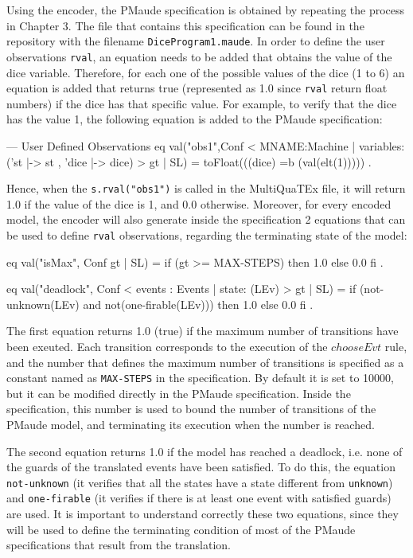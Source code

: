 Using the encoder, the PMaude specification is obtained by repeating the process in Chapter 3. The file that contains this specification can be found in the repository with the filename \texttt{DiceProgram1.maude}. In order to define the user observations \texttt{rval}, an equation needs to be added that obtains the value of the dice variable. Therefore, for each one of the possible values of the dice (1 to 6) an equation is added that returns true (represented as 1.0 since \texttt{rval} return float numbers) if the dice has that specific value. For example, to verify that the dice has the value 1, the following equation is added to the PMaude specification:
\begin{maude}

  --- User Defined Observations 
eq val("obs1",{Conf < MNAME:Machine | 
                    variables:('st |-> st , 'dice |-> dice) >} 
                    {gt | SL}) 
                    = toFloat(((dice) =b (val(elt(1))))) .
\end{maude}
Hence, when the \texttt{s.rval("obs1")} is called in the MultiQuaTEx file, it will return 1.0 if the value of the dice is 1, and 0.0 otherwise. Moreover, for every encoded model, the encoder will also generate inside the specification 2 equations that can be used to define \texttt{rval} observations, regarding the terminating state of the model:
\begin{maude}

eq val("isMax", {Conf} {gt | SL}) = if (gt >= MAX-STEPS) 
                                    then 1.0 
                                    else 0.0 fi .

 eq val("deadlock", {Conf < events : Events | state: (LEv) >} 
                    {gt | SL}) = if (not-unknown(LEv) and not(one-firable(LEv))) 
                                 then 1.0 
                                 else 0.0 fi .
\end{maude}
The first equation returns 1.0 (true) if the maximum number of transitions have been exeuted. Each transition corresponds to the execution of the $chooseEvt$ rule, and the number that defines the maximum number of transitions is specified as a constant named as \texttt{MAX-STEPS} in the specification. By default it is set to 10000, but it can be modified directly in the PMaude specification. Inside the specification, this number is used to bound the number of transitions of the PMaude model, and terminating its execution when the number is reached.

The second equation returns 1.0 if the model has reached a deadlock, i.e. none of the guards of the translated events have been satisfied. To do this, the equation \texttt{not-unknown} (it verifies that all the states have a state different from \texttt{unknown}) and \texttt{one-firable} (it verifies if there is at least one event with satisfied guards) are used. It is important to understand correctly these two equations, since they will be used to define the terminating condition of most of the PMaude specifications that result from the translation. 

